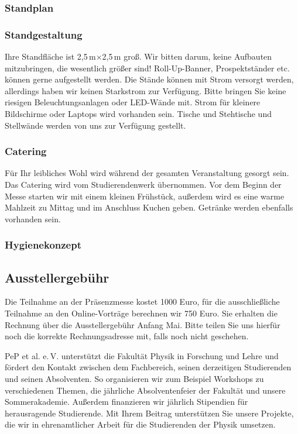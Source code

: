 \documentclass[
  paper=a4,
  fontsize=12pt,
  DIV=16,
  headheight=30pt,
  footheight=45pt,
  headinclude,
  parskip=half,
]{scrartcl}
\begin{document}
\subsubsection*{Standplan}
\subsubsection*{Standgestaltung}
Ihre Standfläche ist 2,5\,m$\times$2,5\,m groß.
Wir bitten darum, keine Aufbauten mitzubringen, die wesentlich größer sind!
Roll-Up-Banner, Prospektständer etc. können gerne aufgestellt werden.
Die Stände können mit Strom versorgt werden, allerdings haben wir keinen Starkstrom zur Verfügung.
Bitte bringen Sie keine riesigen Beleuchtungsanlagen oder LED-Wände mit.
Strom für kleinere Bildschirme oder Laptops wird vorhanden sein.
Tische und Stehtische und Stellwände werden von uns zur Verfügung gestellt.

\subsubsection*{Catering}
Für Ihr leibliches Wohl wird während der gesamten Veranstaltung gesorgt sein.
Das Catering wird vom Studierendenwerk übernommen.
Vor dem Beginn der Messe starten wir mit einem kleinen Frühstück, außerdem wird es eine warme Mahlzeit zu Mittag und im Anschluss Kuchen geben.
Getränke werden ebenfalls vorhanden sein.

\subsubsection*{Hygienekonzept}


\subsection*{Ausstellergebühr}
Die Teilnahme an der Präsenzmesse kostet 1000 Euro, für die ausschließliche Teilnahme an den Online-Vorträge berechnen wir 750 Euro.
Sie erhalten die Rechnung über die Ausstellergebühr Anfang Mai.
Bitte teilen Sie uns hierfür noch die korrekte Rechnungsadresse mit, falls noch nicht geschehen.


PeP et al. e.\,V. unterstützt die Fakultät Physik in Forschung und Lehre und fördert den Kontakt zwischen dem Fachbereich, seinen derzeitigen Studierenden und seinen Absolventen.
So organisieren wir zum Beispiel Workshops zu verschiedenen Themen, die jährliche Absolventenfeier der Fakultät und unsere Sommerakademie.
Außerdem finanzieren wir jährlich Stipendien für herausragende Studierende.
Mit Ihrem Beitrag unterstützen Sie unsere Projekte, die wir in ehrenamtlicher Arbeit für die Studierenden der Physik umsetzen.
\end{document}
